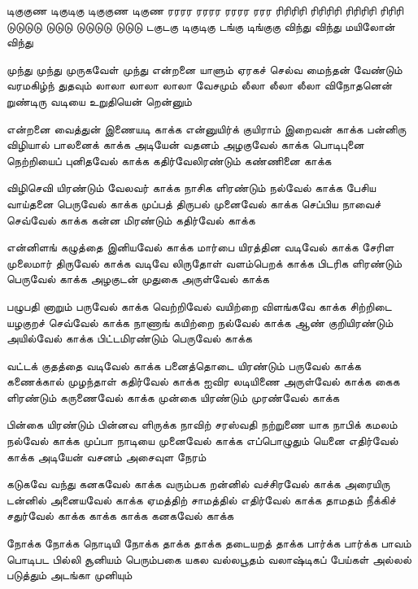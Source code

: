 \begin{flushleft}
{        டிகுகுண டிகுடிகு டிகுகுண டிகுண
        ரரரர ரரரர ரரரர ரரர
        ரிரிரிரி ரிரிரிரி ரிரிரிரி ரிரிரி
        டுடுடுடு டுடுடு டுடுடுடு டுடுடு
        டகுடகு டிகுடிகு டங்கு டிங்குகு
        விந்து விந்து மயிலோன் விந்து

        முந்து முந்து முருகவேள் முந்து
        என்றனை யாளும் ஏரகச் செல்வ
        மைந்தன் வேண்டும் வரமகிழ்ந் துதவும்
        லாலா லாலா லாலா வேசமும்
        லீலா லீலா லீலா விநோதனென்
        றுண்டிரு வடியை உறுதியென் றென்னும்

        என்றனை வைத்துன் இணையடி காக்க
        என்னுயிர்க் குயிராம் இறைவன் காக்க
        பன்னிரு விழியால் பாலனைக் காக்க
        அடியேன் வதனம் அழகுவேல் காக்க
        பொடிபுனை நெற்றியைப் புனிதவேல் காக்க
        கதிர்வேலிரண்டும் கண்ணினை காக்க

        விழிசெவி யிரண்டும் வேலவர் காக்க
        நாசிக ளிரண்டும் நல்வேல் காக்க
        பேசிய வாய்தனை பெருவேல் காக்க
        முப்பத் திருபல் முனைவேல் காக்க
        செப்பிய நாவைச் செவ்வேல் காக்க
        கன்ன மிரண்டும் கதிர்வேல் காக்க

        என்னிளங் கழுத்தை இனியவேல் காக்க
        மார்பை யிரத்தின வடிவேல் காக்க
        சேரிள முலைமார் திருவேல் காக்க
        வடிவே லிருதோள் வளம்பெறக் காக்க
        பிடரிக ளிரண்டும் பெருவேல் காக்க
        அழகுடன் முதுகை அருள்வேல் காக்க

        பழுபதி னாறும் பருவேல் காக்க
        வெற்றிவேல் வயிற்றை விளங்கவே காக்க
        சிற்றிடை யழகுறச் செவ்வேல் காக்க
        நாணாங் கயிற்றை நல்வேல் காக்க
        ஆண் குறியிரண்டும் அயில்வேல் காக்க
        பிட்டமிரண்டும் பெருவேல் காக்க

        வட்டக் குதத்தை வடிவேல் காக்க
        பனைத்தொடை யிரண்டும் பருவேல் காக்க
        கணைக்கால் முழந்தாள் கதிர்வேல் காக்க
        ஐவிர லடியிணை அருள்வேல் காக்க
        கைக ளிரண்டும் கருணைவேல் காக்க
        முன்கை யிரண்டும் முரண்வேல் காக்க

        பின்கை யிரண்டும் பின்னவ ளிருக்க
        நாவிற் சரஸ்வதி நற்றுணை யாக
        நாபிக் கமலம் நல்வேல் காக்க
        முப்பா நாடியை முனைவேல் காக்க
        எப்பொழுதும் யெனை எதிர்வேல் காக்க
        அடியேன் வசனம் அசைவுள நேரம்

        கடுகவே வந்து கனகவேல் காக்க
        வரும்பக றன்னில் வச்சிரவேல் காக்க
        அரையிரு டன்னில் அனையவேல் காக்க
        ஏமத்திற் சாமத்தில் எதிர்வேல் காக்க
        தாமதம் நீக்கிச் சதுர்வேல் காக்க
        காக்க காக்க கனகவேல் காக்க

        நோக்க நோக்க நொடியி நோக்க
        தாக்க தாக்க தடையறத் தாக்க
        பார்க்க பார்க்க பாவம் பொடிபட
        பில்லி சூனியம் பெரும்பகை யகல
        வல்லபூதம் வலாஷ்டிகப் பேய்கள்
        அல்லல் படுத்தும் அடங்கா முனியும்

}
\end{flushleft}
